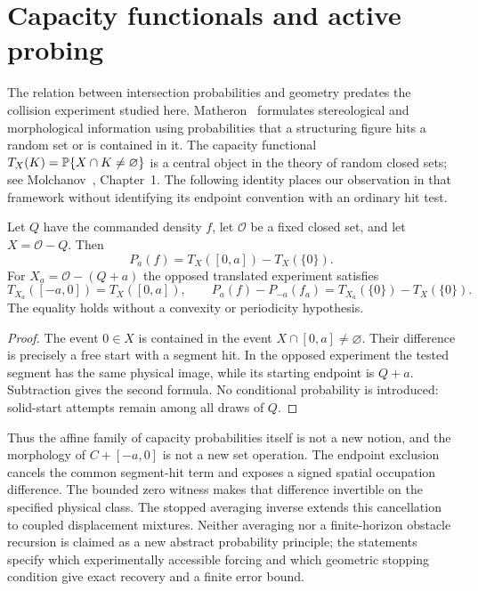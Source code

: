 \section{Capacity functionals and active probing}
\label{sec:hit-comparison}
The relation between intersection probabilities and geometry predates
the collision experiment studied here. Matheron~\cite{Matheron} formulates
stereological and morphological information using probabilities that a
structuring figure hits a random set or is contained in it. The capacity
functional $T_X(K)=\mathbb P\{X\cap K\ne\varnothing\}$ is a central
object in the theory of random closed sets; see Molchanov~\cite{Molchanov},
Chapter~1. The following identity places our observation in that
framework without identifying its endpoint convention with an ordinary
hit test.

\begin{proposition}
\label{prop:capacity}
Let $Q$ have the commanded density $f$, let $\mathcal O$ be a fixed
closed set, and let $X=\mathcal O-Q$. Then
\begin{equation}\label{eq:capacity-bit}
 P_a(f)=T_X([0,a])-T_X(\{0\}).
\end{equation}
For $X_a=\mathcal O-(Q+a)$ the opposed translated experiment satisfies
\[
 T_{X_a}([-a,0])=T_X([0,a]),\qquad
 P_a(f)-P_{-a}(f_a)=T_{X_a}(\{0\})-T_X(\{0\}).
\]
The equality holds without a convexity or periodicity hypothesis.
\end{proposition}
\begin{proof}
The event $0\in X$ is contained in the event $X\cap[0,a]\ne\varnothing$.
Their difference is precisely a free start with a segment hit. In the
opposed experiment the tested segment has the same physical image, while
its starting endpoint is $Q+a$. Subtraction gives the second formula.
No conditional probability is introduced: solid-start attempts remain
among all draws of $Q$.
\end{proof}

Thus the affine family of capacity probabilities itself is not a new
notion, and the morphology of $C+[-a,0]$ is not a new set operation.
The endpoint exclusion cancels the common segment-hit term and exposes
a signed spatial occupation difference. The bounded zero witness makes
that difference invertible on the specified physical class. The stopped
averaging inverse extends this cancellation to coupled displacement
mixtures. Neither averaging nor a finite-horizon obstacle recursion is
claimed as a new abstract probability principle; the statements specify
which experimentally accessible forcing and which geometric stopping
condition give exact recovery and a finite error bound.

